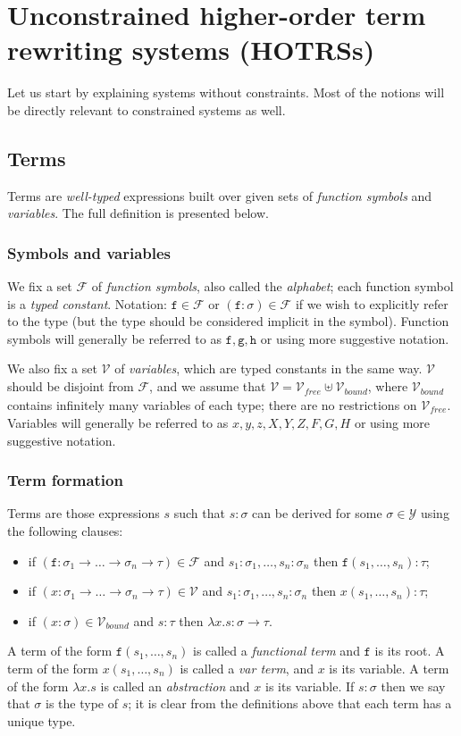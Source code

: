 \documentclass{lmcs}
\theoremstyle{theorem}\newtheorem{theorem}[dummy]{Theorem}
\theoremstyle{theorem}\newtheorem{lemma}[dummy]{Lemma}
\theoremstyle{theorem}\newtheorem{corollary}[dummy]{Corollary}
\theoremstyle{definition}\newtheorem{definition}[dummy]{Definition}
\theoremstyle{definition}\newtheorem{example}[dummy]{Example}
\newcommand{\F}{\mathcal{F}}
\newcommand{\V}{\mathcal{V}}
\newcommand{\Vfree}{\mathcal{V}_{\mathit{free}}}
\newcommand{\Vbound}{\mathcal{V}_{\mathit{bound}}}
\newcommand{\Types}{\mathcal{Y}}
\newcommand{\atype}{\sigma}
\newcommand{\btype}{\tau}
\newcommand{\identifier}[1]{\mathtt{#1}}
\newcommand{\afun}{\identifier{f}}
\newcommand{\bfun}{\identifier{g}}
\newcommand{\cfun}{\identifier{h}}
\newcommand{\avar}{x}
\newcommand{\bvar}{y}
\newcommand{\cvar}{z}
\newcommand{\Avar}{X}
\newcommand{\Bvar}{Y}
\newcommand{\Cvar}{Z}
\newcommand{\AFvar}{F}
\newcommand{\BFvar}{G}
\newcommand{\CFvar}{H}
\newcommand{\abs}[2]{\lambda #1.#2}
\newcommand{\arrtype}{\rightarrow}
\newcommand{\mysubsection}[1]{\vspace{-12pt}\subsubsection{#1}}
\begin{document}
\section{Unconstrained higher-order term rewriting systems (HOTRSs)}

Let us start by explaining systems without constraints. Most of the notions will be directly
relevant to constrained systems as well.

\subsection{Terms}
Terms are \emph{well-typed} expressions built over given sets of \emph{function symbols} and
\emph{variables}. The full definition is presented below.

\mysubsection{Symbols and variables}

We fix a set $\F$ of \emph{function symbols}, also called the \emph{alphabet}; each function symbol
is a \emph{typed constant}. Notation: $\afun \in \F$ or $(\afun : \atype) \in \F$ if we wish to
explicitly refer to the type (but the type should be considered implicit in the symbol).
Function symbols will generally be referred to as $\afun,\bfun,\cfun$ or using more suggestive
notation.

We also fix a set $\V$ of \emph{variables}, which are typed constants in the same way.  $\V$ should
be disjoint from $\F$, and we assume that $\V = \Vfree \uplus \Vbound$, where $\Vbound$ contains
infinitely many variables of each type; there are no restrictions on $\Vfree$.
Variables will generally be referred to as $\avar,\bvar,\cvar,\Avar,\Bvar,\Cvar,\AFvar,\BFvar,
\CFvar$ or using more suggestive notation.

\mysubsection{Term formation}

Terms are those expressions $s$ such that $s : \atype$ can be derived for some $\atype \in \Types$
using the following clauses:
\begin{itemize}
\item if $(\afun : \atype_1 \arrtype \dots \arrtype \atype_n \arrtype \btype) \in \F$ and
  $s_1 : \atype_1,\dots,s_n : \atype_n$ then $\afun(s_1,\dots,s_n) : \btype$;
\item if $(\avar : \atype_1 \arrtype \dots \arrtype \atype_n \arrtype \btype) \in \V$ and
  $s_1 : \atype_1,\dots,s_n : \atype_n$ then $\avar(s_1,\dots,s_n) : \btype$;
\item if $(\avar : \atype) \in \Vbound$ and $s : \btype$ then $\abs{\avar}{s} : \atype \arrtype
  \btype$.
\end{itemize}
A term of the form $\afun(s_1,\dots,s_n)$ is called a \emph{functional term} and $\afun$ is its
root.
A term of the form $\avar(s_1,\dots,s_n)$ is called a \emph{var term}, and $\avar$ is its variable.
A term of the form $\abs{\avar}{s}$ is called an \emph{abstraction} and $\avar$ is its variable.
If $s : \atype$ then we say that $\atype$ is the type of $s$; it is clear from the definitions
above that each term has a unique type.
\end{document}
